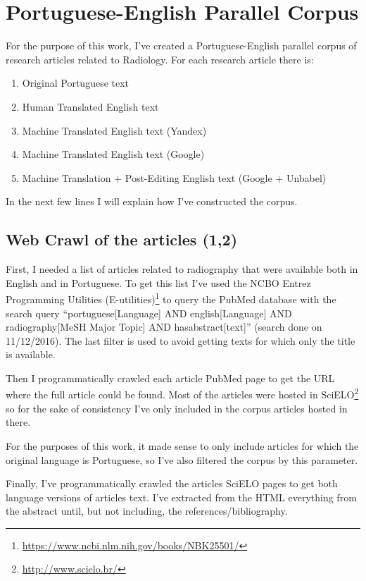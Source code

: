 \label{chap3}

\section{Portuguese-English Parallel Corpus}

For the purpose of this work, I've created a Portuguese-English parallel corpus of research articles related to Radiology. For each research article there is:

\begin{enumerate}
\item Original Portuguese text
\item Human Translated English text
\item Machine Translated English text (Yandex) 
\item Machine Translated English text (Google) 
\item Machine Translation + Post-Editing English text (Google + Unbabel) 
\end{enumerate}

\noindent In the next few lines I will explain how I've constructed the corpus. 

\subsection{Web Crawl of the articles (1,2)}

First, I needed a list of articles related to radiography that were available both in English and in Portuguese. To get this list I’ve used the  NCBO Entrez Programming Utilities (E-utilities)\footnote{\url{https://www.ncbi.nlm.nih.gov/books/NBK25501/}} to query the PubMed database with the search query “portuguese[Language] AND english[Language] AND radiography[MeSH Major Topic] AND hasabstract[text]” (search done on 11/12/2016). The last filter is used to avoid getting texts for which only the title is available. 

Then I programmatically crawled each article PubMed page to get the URL where the full article could be found. Most of the articles were hosted in SciELO\footnote{\url{http://www.scielo.br/}} so for the sake of consistency I've only included in the corpus articles hosted in there. 

For the purposes of this work, it made sense to only include articles for which the original language is Portuguese, so I've also filtered the corpus by this parameter. 

Finally, I've programmatically crawled the articles SciELO pages to get both language versions of articles text. I've extracted from the HTML everything from the abstract until, but not including, the references/bibliography.

